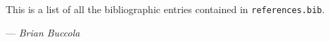\documentclass{article}
\newcommand{\name}{Brian Buccola}
\begin{document}
This is a list of all the bibliographic entries contained in
\texttt{references.bib}.

\hfill --- \textit{\name}


\nocite{*}


\end{document}
